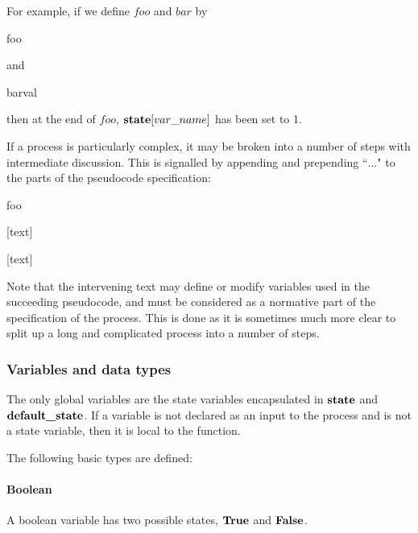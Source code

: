 For example, if we define $foo$ and $bar$ by

\begin{pseudo}{foo}{}
\end{pseudo}

and 

\begin{pseudo}{bar}{val}
\end{pseudo}

then at the end of $foo$, $\textbf{state}[var\_name]$ has been set to 1.

If a process is particularly complex, it may be broken into a number of steps with 
intermediate discussion. This is signalled by appending  and prepending ``$\hdots$" to
the parts of the pseudocode specification:

\begin{pseudo}{foo}{}
\bsCODE{\hdots}
\end{pseudo}

[text]

\begin{pseudo*}
\bsCODE{\hdots}
\end{pseudo*}

[text]

\begin{pseudo*}
\end{pseudo*}

Note that the intervening text may define or modify variables used in the succeeding
pseudocode, and must be considered as a normative part of the specification of the process.
This is done as it is sometimes much more clear to split up a long and complicated process
into a number of steps.

\subsubsection{Variables and data types}
\label{datatypes}

The only global variables are the state variables encapsulated in $\textbf{state}$
and $\textbf{default\_state}$. If a variable is not declared as an input to
the process and is not a state variable, then it is local to the function.

The following basic types are defined:

\paragraph*{Boolean} A boolean variable has two possible states, $\text{\bf{True}}$ and $\text{\bf{False}}$.

